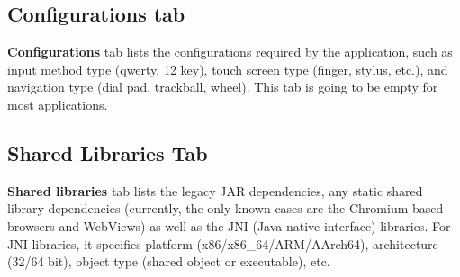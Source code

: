 \subsection{Configurations tab}\label{subsec:configurations-tab} %
\textbf{Configurations} tab lists the configurations required by the application, such as input
method type (qwerty, 12 key), touch screen type (finger, stylus, etc.), and navigation type (dial
pad, trackball, wheel). This tab is going to be empty for most applications.

\subsection{Shared Libraries Tab}\label{subsec:shared-libs-tab} %
\textbf{Shared libraries} tab lists the legacy JAR dependencies, any static shared library
dependencies (currently, the only known cases are the Chromium-based browsers and WebViews) as well
as the JNI (Java native interface) libraries. For JNI libraries, it specifies platform
(x86/x86\_64/ARM/AArch64), architecture (32/64 bit), object type (shared object or executable), etc.
